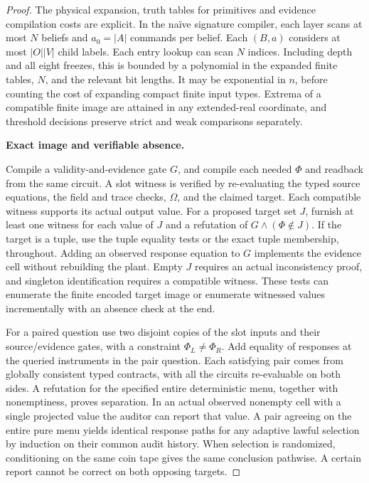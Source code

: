 \begin{proof}
The physical expansion, truth tables for primitives and evidence compilation costs are explicit. In the naïve signature compiler, each layer scans at most \(N\) beliefs and \(a_0=|A|\) commands per belief. Each \((B,a)\) considers at most \(|O||V|\) child labels. Each entry lookup can scan \(N\) indices. Including depth and all eight freezes, this is bounded by a polynomial in the expanded finite tables, \(N\), and the relevant bit lengths. It may be exponential in \(n\), before counting the cost of expanding compact finite input types. Extrema of a compatible finite image are attained in any extended-real coordinate, and threshold decisions preserve strict and weak comparisons separately.

\textbf{Exact image and verifiable absence.}

Compile a validity-and-evidence gate \(G\), and compile each needed \(\Phi\) and readback from the same circuit. A slot witness is verified by re-evaluating the typed source equations, the field and trace checks, \(\Omega\), and the claimed target. Each compatible witness supports its actual output value. For a proposed target set \(J\), furnish at least one witness for each value of \(J\) and a refutation of \(G\land(\Phi\notin J)\). If the target is a tuple, use the tuple equality tests or the exact tuple membership, throughout. Adding an observed response equation to \(G\) implements the evidence cell without rebuilding the plant. Empty \(J\) requires an actual inconsistency proof, and singleton identification requires a compatible witness. These tests can enumerate the finite encoded target image or enumerate witnessed values incrementally with an absence check at the end.

For a paired question use two disjoint copies of the slot inputs and their source/evidence gates, with a constraint \(\Phi_L\ne\Phi_R\). Add equality of responses at the queried instruments in the pair question. Each satisfying pair comes from globally consistent typed contracts, with all the circuits re-evaluable on both sides. A refutation for the specified entire deterministic menu, together with nonemptiness, proves separation. In an actual observed nonempty cell with a single projected value the auditor can report that value. A pair agreeing on the entire pure menu yields identical response paths for any adaptive lawful selection by induction on their common audit history. When selection is randomized, conditioning on the same coin tape gives the same conclusion pathwise. A certain report cannot be correct on both opposing targets.


\end{proof}
